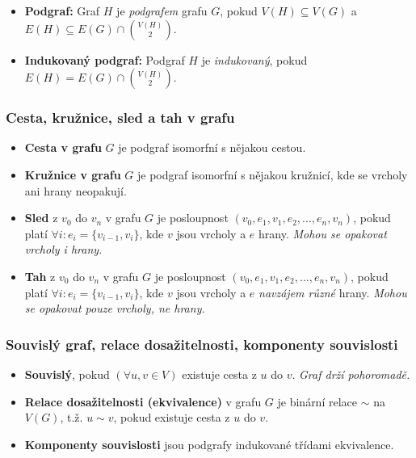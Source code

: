 \documentclass[10pt,a4paper]{article}
\begin{document}
\begin{itemize}
    \item \textbf{Podgraf:} Graf $H$ je \textit{podgrafem} grafu $G$, pokud $V(H) \subseteq V(G)$ a $E(H) \subseteq E(G) \cap \binom{V(H)}{2}$.
    \item \textbf{Indukovaný podgraf:} Podgraf $H$ je \textit{indukovaný}, pokud $E(H)=E(G) \cap \binom{V(H)}{2}$.
\end{itemize}

\subsubsection{Cesta, kružnice, sled a tah v grafu}

\begin{itemize}
    \item \textbf{Cesta v grafu} $G$ je podgraf isomorfní s nějakou cestou.
    \item \textbf{Kružnice v grafu} $G$ je podgraf isomorfní s nějakou kružnicí, kde se vrcholy ani hrany neopakují.
    \item \textbf{Sled} z $v_0$ do $v_n$ v grafu $G$ je posloupnost $(v_0, e_1, v_1, e_2, ..., e_n, v_n)$, pokud platí $\forall i: e_i = \{v_{i-1}, v_i\}$, kde $v$ jsou vrcholy a $e$ hrany. \textit{Mohou se opakovat vrcholy i hrany.}
    \item \textbf{Tah} z $v_0$ do $v_n$ v grafu $G$ je posloupnost $(v_0, e_1, v_1, e_2, ... , e_n, v_n)$, pokud platí $\forall i : e_i = \{v_{i-1} , v_i \}$, kde $v$ jsou vrcholy a $e$ \textit{navzájem různé} hrany. \textit{Mohou se opakovat pouze vrcholy, ne hrany.}
\end{itemize}

\subsubsection{Souvislý graf, relace dosažitelnosti, komponenty souvislosti}

\begin{itemize}
    \item \textbf{Souvislý}, pokud $(\forall u, v \in V)$ existuje cesta z $u$ do $v$. \textit{Graf drží pohoromadě.}
    \item \textbf{Relace dosažitelnosti (ekvivalence)} v grafu $G$ je binární relace $\sim$ na $V(G)$, t.ž. $u \sim v$, pokud existuje cesta z $u$ do $v$.
    \item \textbf{Komponenty souvislosti} jsou podgrafy indukované třídami ekvivalence.
\end{itemize}
\end{document}
